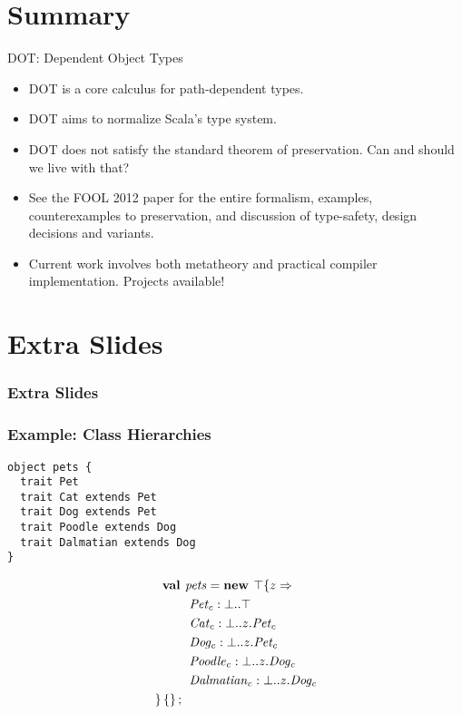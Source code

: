 \documentclass{beamer}
\begin{document}
\section{Summary}

\begin{frame}[fragile]{DOT: Dependent Object Types}
\begin{itemize}
\item DOT is a core calculus for path-dependent types.
\item DOT aims to normalize Scala's type system.
\item DOT does not satisfy the standard theorem of preservation. Can and should we live with that?
\item See the FOOL 2012 paper for the entire formalism, examples,
  counterexamples to preservation, and discussion of type-safety,
  design decisions and variants.
\item Current work involves both metatheory and practical compiler implementation. Projects available!
\end{itemize}
\end{frame}

\section{Extra Slides}

\begin{frame}
\frametitle{Extra Slides}
\end{frame}

\begin{frame}[fragile]
\frametitle{Example: Class Hierarchies}
\begin{verbatim}
object pets {
  trait Pet
  trait Cat extends Pet
  trait Dog extends Pet
  trait Poodle extends Dog
  trait Dalmatian extends Dog
}
\end{verbatim}
\begin{align*}
\textbf{val }&\mathit{pets} = \textbf{new }\top \{z \Rightarrow \\
&\ \mathit{Pet_c} : \bot..\top\\
&\ \mathit{Cat_c} : \bot..z.{\mathit{Pet_c}}\\
&\ \mathit{Dog_c} : \bot..z.{\mathit{Pet_c}}\\
&\ \mathit{Poodle_c} : \bot..z.{\mathit{Dog_c}}\\
&\ \mathit{Dalmatian_c} : \bot..z.{\mathit{Dog_c}}\\
 \} \left\{\right\} ;\;\\&
\end{align*}
\end{frame}
\end{document}
